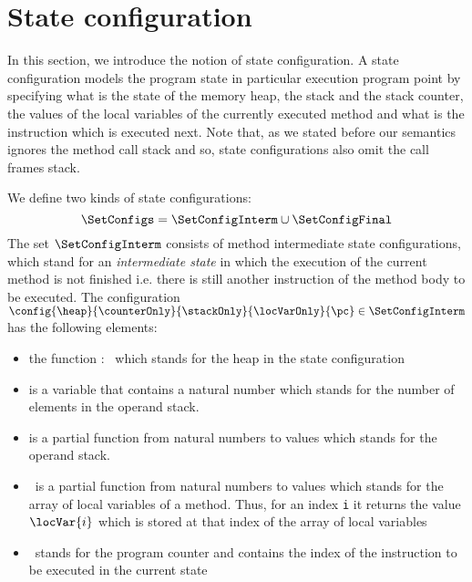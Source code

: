 
\newtheorem{StateProp0}{Substitution Property for Expressions}
\newtheorem{StateProp1}[StateProp0]{Substitution Property for Formulas}
\newtheorem{UpdateStateSem}[StateProp0]{Definition}


\newtheorem{AtState}{Definition}


\newtheorem{FormulaInterp}[AtState]{Definition}
\newtheorem{StateProp2}[AtState]{Substitution Property for Field Functions } %


\section{State configuration}\label{def}
 In this section, we introduce the notion of state configuration.
 A state configuration \SetConfigs models the program state in particular execution
 program point by specifying what is the state of the memory heap, the stack and the stack counter, the values of the
 local variables of the currently executed method  and what is the instruction which is executed next. Note that, as we stated before our 
 semantics ignores the method call stack and so, state configurations also omit the call frames stack. 
 
 We define two kinds of state configurations:
 $$\SetConfigs = \SetConfigInterm \cup \SetConfigFinal$$
 The set $\SetConfigInterm$ consists of method intermediate state configurations, which stand for an 
 \textit{intermediate state} in which the execution of the current method is not finished i.e.
 there is still another instruction of the method body to be executed.  
 The configuration $\config{\heap}{\counterOnly}{\stackOnly}{\locVarOnly}{\pc} \in \SetConfigInterm$ has the following elements:
               \begin{itemize}
                     \item the function \heap : \HeapSet \ which stands for the heap in the state configuration
	   
	             \item \counterOnly is a variable that contains a natural number which stands for the number of
		     elements in the operand stack.  

		     \item \stackOnly is a partial function from natural numbers to values  which  stands for 
		     the operand stack.

	             \item \locVarOnly \ is a partial function from natural numbers to values which stands for
		     the array of local variables of a method.
		     Thus,  for an index \texttt{i} it returns the value $\locVar{i}$ which is stored at that 
		     index of the array of local variables
	
	            \item \pc \ stands for the program counter and contains the index of the instruction to be executed in the current state
	        \end{itemize}


